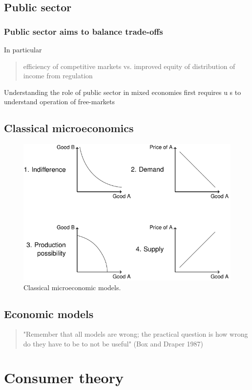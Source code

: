 \subsection{Public sector}
\subsubsection{Public sector aims to balance trade-offs}
In particular
\begin{quote}
  efficiency of competitive markets vs. improved equity of distribution of income from regulation
\end{quote}
Understanding the role of public sector in mixed economies first requires u s to understand operation of free-markets
\subsection{Classical microeconomics}
\begin{figure}[H]
  \centering
  \includegraphics[width = 0.9 \textwidth]{./img/figure3.png}
  \caption{Classical microeconomic models.}
\end{figure}
\subsection{Economic models}
\begin{quote}
  "Remember that all models are wrong; the practical question is how wrong do they have to be to not be useful" (Box and Draper 1987)
\end{quote}
\section{Consumer theory}
